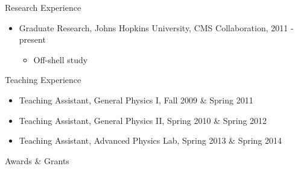 \begin{small}

\begin{cvlist}{Research Experience}
\item
\begin{itemize}\itemsep=0.25em
	\item Graduate Research, Johns Hopkins University, CMS Collaboration, 2011 - present
         	\begin{itemize}
		\item Off-shell study

	\end{itemize}
\end{itemize}
\end{cvlist}

\begin{cvlist}{Teaching Experience}
\item
\begin{itemize}\itemsep=0.25em
	\item Teaching Assistant, General Physics I, Fall 2009 \& Spring 2011
	\item Teaching Assistant, General Physics II, Spring 2010 \& Spring 2012
	\item Teaching Assistant, Advanced Physics Lab, Spring 2013 \& Spring 2014
\end{itemize}
\end{cvlist}

\begin{cvlist}{Awards \& Grants}
\item
\end{cvlist}


\end{small}
